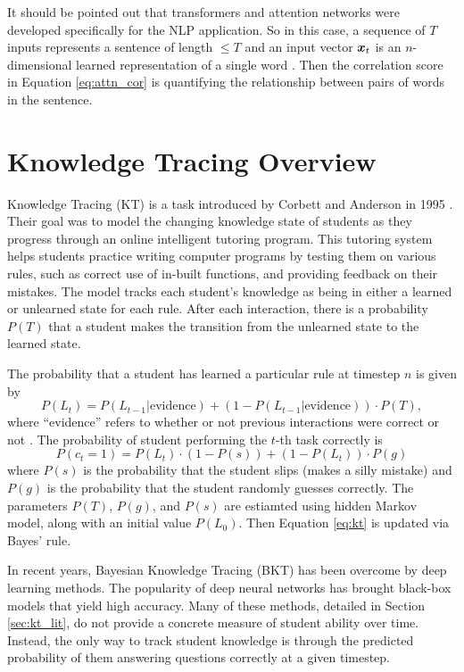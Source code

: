 It should be pointed out that transformers and attention networks were developed specifically for the NLP application. So in this case, a sequence of $T$ inputs represents a sentence of length $\leq T$ and an input vector $\boldsymbol{x}_t$ is an $n$-dimensional learned representation of a single word \cite{mikolov2013}. Then the correlation score in Equation \ref{eq:attn_cor} is quantifying the relationship between pairs of words in the sentence.


\section*{Knowledge Tracing Overview}
Knowledge Tracing (KT) is a task introduced by Corbett and Anderson in 1995 \cite{corbett1995}. Their goal was to model the changing knowledge state of students as they progress through an online intelligent tutoring program. This tutoring system helps students practice writing computer programs by testing them on various rules, such as correct use of in-built functions, and providing feedback on their mistakes. The model tracks each student's knowledge as being in either a learned or unlearned state for each rule. After each interaction, there is a probability $P(T)$ that a student makes the transition from the unlearned state to the learned state.

The probability that a student has learned a particular rule at timestep $n$ is given by
\begin{equation}
  P(L_t) = P(L_{t-1} | \text{evidence}) + (1 - P(L_{t-1} | \text{evidence})) \cdot P(T),
\label{eq:kt}
\end{equation}
where ``evidence'' refers to whether or not previous interactions were correct or not \cite{corbett1995}. The probability of student performing the $t$-th task correctly is 
\begin{equation}
  P(c_t = 1) = P(L_t) \cdot (1 - P(s)) + (1 - P(L_t))\cdot P(g)
  \label{eq:kt_prob_correct}
\end{equation}
where $P(s)$ is the probability that the student slips (makes a silly mistake) and $P(g)$ is the probability that the student randomly guesses correctly. The parameters $P(T)$, $P(g)$, and $P(s)$ are estiamted using hidden Markov model, along with an initial value $P(L_0)$. Then Equation \ref{eq:kt} is updated via Bayes' rule.

In recent years, Bayesian Knowledge Tracing (BKT) has been overcome by deep learning methods. The popularity of deep neural networks has brought black-box models that yield high accuracy. Many of these methods, detailed in Section \ref{sec:kt_lit}, do not provide a concrete measure of student ability over time. Instead, the only way to track student knowledge is through the predicted probability of them answering questions correctly at a given timestep. 

